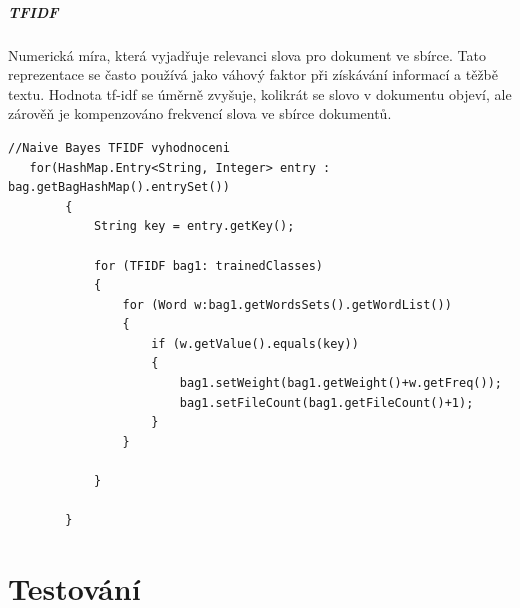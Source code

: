 \documentclass[a4paper,12pt]{article}
\begin{document}
\pagebreak
\subparagraph*{TFIDF}
Numerická míra, která vyjadřuje relevanci slova pro dokument ve sbírce. Tato reprezentace se často používá jako váhový faktor při získávání informací a těžbě textu. Hodnota tf-idf se úměrně zvyšuje, kolikrát se slovo v dokumentu objeví, ale zárověň je kompenzováno frekvencí slova ve sbírce dokumentů.
\begin{lstlisting}
//Naive Bayes TFIDF vyhodnoceni
   for(HashMap.Entry<String, Integer> entry : bag.getBagHashMap().entrySet())
        {
            String key = entry.getKey();

            for (TFIDF bag1: trainedClasses)
            {
                for (Word w:bag1.getWordsSets().getWordList())
                {
                    if (w.getValue().equals(key))
                    {
                        bag1.setWeight(bag1.getWeight()+w.getFreq());
                        bag1.setFileCount(bag1.getFileCount()+1);
                    }
                }

            }

        }
\end{lstlisting}

\pagebreak
\section{Testování}
\end{document}

